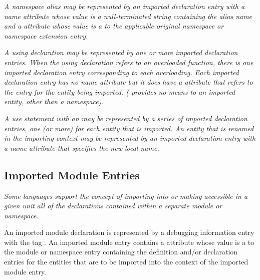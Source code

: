 \textit{A 
namespace alias\hypertarget{chap:DWATimportnamespacealias}{} 
may be represented by an imported declaration entry 
with a name attribute whose value is
a null-terminated string containing the alias name
and a \DWATimportDEFN{} attribute 
whose value is a  to the 
applicable original namespace or namespace extension entry.}

\textit{A  using declaration may be represented 
by one or more
imported\hypertarget{chap:DWATimportnamespaceusingdeclaration}{} 
declaration entries.  When the using declaration
refers to an overloaded function, there is one imported
declaration entry corresponding to each overloading. Each
imported declaration entry has no name attribute but it does
have a \DWATimportDEFN{} attribute that refers to the entry for the
entity being imported. ( 
provides no means to 
an imported entity, other than a namespace).}


\textit{A  use statement 
with an  may be
represented by a series of imported declaration entries,
one (or more) for each entity that is imported. An entity
that is renamed in the importing context may be represented
by an imported declaration entry with a name attribute that
specifies the new local name.
}

\subsection{Imported Module Entries}
\label{chap:importedmoduleentries}

\textit{Some languages support the concept of importing into or making
accessible in a given unit all of the declarations contained
within a separate module or namespace.
}

An imported module declaration is represented by a debugging
information entry with 
the 
tag \DWTAGimportedmoduleTARG.
An
imported module entry contains a 
\DWATimport{} attribute
whose value is a  
to the module or namespace entry
containing the definition and/or declaration entries for
the entities that are to be imported into the context of the
imported module entry.

